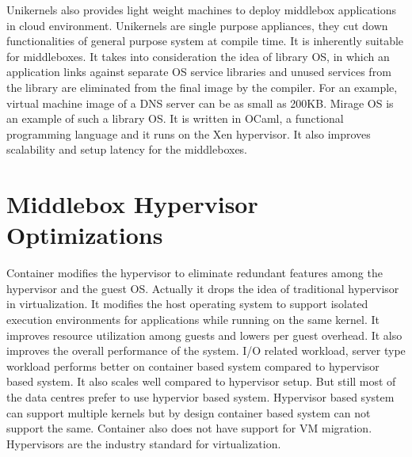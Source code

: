 \documentclass[a4paper,11pt]{report}
\begin{document}
Unikernels\cite{Madhavapeddy:2013:ULO:2451116.2451167} also provides light weight machines to deploy middlebox applications in cloud environment. Unikernels are single purpose appliances, they cut down functionalities of general purpose system at compile time. It is inherently suitable for middleboxes. It takes into consideration the idea of library OS, in which an application links against separate OS service libraries and unused services from the library are eliminated from the final image by the compiler. For an example, virtual machine image of a DNS server can be as small as 200KB. Mirage OS\cite{MR} is an example of such a library OS. It is written in OCaml, a functional programming language and it runs on the Xen hypervisor\cite{XH}. It also improves scalability and setup latency for the middleboxes.                    
\section{Middlebox Hypervisor Optimizations}

Container\cite{Soltesz:2007:COS:1272996.1273025} modifies the hypervisor to eliminate redundant features among the hypervisor and the guest OS. Actually it drops the idea of traditional hypervisor in virtualization. It modifies the host operating system to support isolated execution environments for applications while running on the same kernel. It improves resource utilization among guests and lowers per guest overhead. It also improves the overall performance of the system. I/O related workload, server type workload performs better on container based system compared to hypervisor based system. It also scales well compared to hypervisor setup. But still most of the data centres prefer to use hypervior based system. Hypervisor based system can support multiple kernels but by design container based system can not support the same. Container also does not have support for VM migration. Hypervisors are the industry standard for virtualization.       
\end{document}
